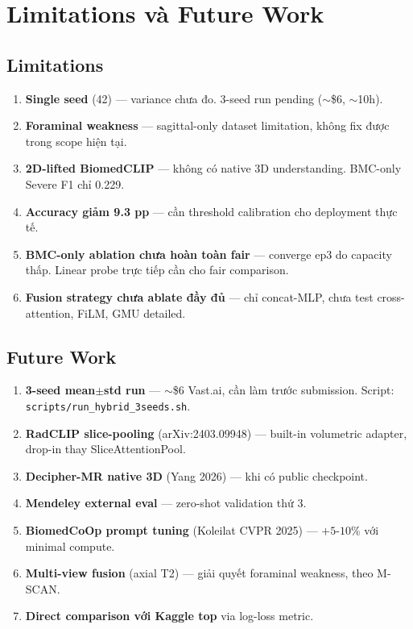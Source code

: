 \documentclass[11pt,a4paper]{article}
\begin{document}
\section{Limitations và Future Work}

\subsection{Limitations}

\begin{enumerate}[leftmargin=*]
\item \textbf{Single seed} (42) --- variance chưa đo. 3-seed run pending
($\sim$\$6, $\sim$10h).
\item \textbf{Foraminal weakness} --- sagittal-only dataset limitation,
không fix được trong scope hiện tại.
\item \textbf{2D-lifted BiomedCLIP} --- không có native 3D understanding.
BMC-only Severe F1 chỉ 0.229.
\item \textbf{Accuracy giảm 9.3 pp} --- cần threshold calibration cho
deployment thực tế.
\item \textbf{BMC-only ablation chưa hoàn toàn fair} --- converge ep3
do capacity thấp. Linear probe trực tiếp cần cho fair comparison.
\item \textbf{Fusion strategy chưa ablate đầy đủ} --- chỉ concat-MLP,
chưa test cross-attention, FiLM, GMU detailed.
\end{enumerate}

\subsection{Future Work}

\begin{enumerate}[leftmargin=*]
\item \textbf{3-seed mean$\pm$std run} --- $\sim$\$6 Vast.ai, cần làm
trước submission. Script: \verb|scripts/run_hybrid_3seeds.sh|.
\item \textbf{RadCLIP slice-pooling} (arXiv:2403.09948) --- built-in
volumetric adapter, drop-in thay SliceAttentionPool.
\item \textbf{Decipher-MR native 3D} (Yang 2026) --- khi có public
checkpoint.
\item \textbf{Mendeley external eval} --- zero-shot validation thứ 3.
\item \textbf{BiomedCoOp prompt tuning} (Koleilat CVPR 2025) ---
$+5$-$10\%$ với minimal compute.
\item \textbf{Multi-view fusion} (axial T2) --- giải quyết foraminal
weakness, theo M-SCAN.
\item \textbf{Direct comparison với Kaggle top} via log-loss metric.
\end{enumerate}
\end{document}
